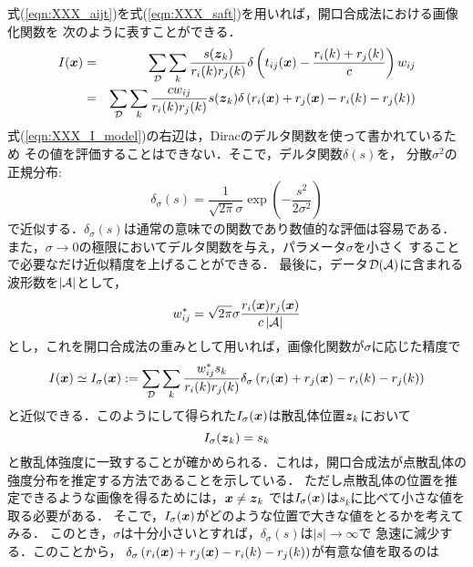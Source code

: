 式(\ref{eqn:XXX_aijt})を式(\ref{eqn:XXX_saft})を用いれば，開口合成法における画像化関数を
次のように表すことができる．
\begin{eqnarray}
	I(\mbox{\boldmath $x$})
	&=&
	\sum_{\cal D}
	\sum_{k}
	\frac{ s(\mbox{\boldmath $z$}_k)}{r_i(k)r_j(k)}
	\delta\left(t_{ij}(\mbox{\boldmath $x$})-\frac{r_i(k)+r_j(k)}{c}\right)  w_{ij}
	\\
	&=&
	\sum_{\cal D} \sum_{k}
	\frac{cw_{ij}}{r_i(k)r_j(k)} s(\mbox{\boldmath $z$}_k)
	\delta\left(r_i(\mbox{\boldmath $x$})+r_j(\mbox{\boldmath $x$})-r_i(k)-r_j(k)\right) 
	\label{eqn:XXX_I_model}
\end{eqnarray}
式(\ref{eqn:XXX_I_model})の右辺は，Diracのデルタ関数を使って書かれているため
その値を評価することはできない．そこで，デルタ関数$\delta(s)$を，
分散$\sigma^2$の正規分布:
\begin{equation}
	\delta_\sigma (s) = \frac{1}{ \sqrt{2\pi}\sigma } \exp\left( -\frac{s^2}{2\sigma^2}\right)
	\label{eqn:Gauss}
\end{equation}
で近似する．$\delta_\sigma(s)$は通常の意味での関数であり数値的な評価は容易である．
また，$\sigma\rightarrow 0$の極限においてデルタ関数を与え，パラメータ$\sigma$を小さく
することで必要なだけ近似精度を上げることができる．
最後に，データ$\cal D(A)$に含まれる波形数を$|{\cal A}|$として，
\begin{equation}
	w_{ij}^*
	=
	\sqrt{2\pi}\sigma
	\frac{r_{i}(\mbox{\boldmath $x$})r_j(\mbox{\boldmath $x$})}{c\left| {\cal A}\right|}
	\label{eqn:XXX_wij_model}
\end{equation}
とし，これを開口合成法の重みとして用いれば，画像化関数が$\sigma$に応じた精度で
\begin{equation}
	I(\mbox{\boldmath $x$})
		\simeq 
	I_\sigma(\mbox{\boldmath $x$})
		:=
	\sum_{\cal D} \sum_{k}
	\frac{w_{ij}^*s_k}{r_i(k)r_j(k)} 
	\delta_\sigma\left(r_i(\mbox{\boldmath $x$})+r_j(\mbox{\boldmath $x$})-r_i(k)-r_j(k)\right) 
	\label{eqn:XXX_saft_model}
\end{equation}
と近似できる．このようにして得られた$I_\sigma(\mbox{\boldmath $x$})$は散乱体位置$\mbox{\boldmath $z$}_k$において
\begin{equation}
	I_\sigma(\mbox{\boldmath $z$}_k)=s_k
	\label{eqn:}
\end{equation}
と散乱体強度に一致することが確かめられる．これは，開口合成法が点散乱体の
強度分布を推定する方法であることを示している．
ただし点散乱体の位置を推定できるような画像を得るためには，$\mbox{\boldmath $x$}\neq \mbox{\boldmath $z$}_k$
では$I_\sigma(\mbox{\boldmath $x$})$は$s_k$に比べて小さな値を取る必要がある．
そこで，$I_\sigma(\mbox{\boldmath $x$})$がどのような位置で大きな値をとるかを考えてみる．
このとき，$\sigma$は十分小さいとすれば，$\delta_\sigma(s)$は$|s|\rightarrow \infty$で
急速に減少する．このことから，
$\delta_\sigma\left(r_i(\mbox{\boldmath $x$})+r_j(\mbox{\boldmath $x$})-r_i(k)-r_j(k)\right)$が有意な値を取るのは

